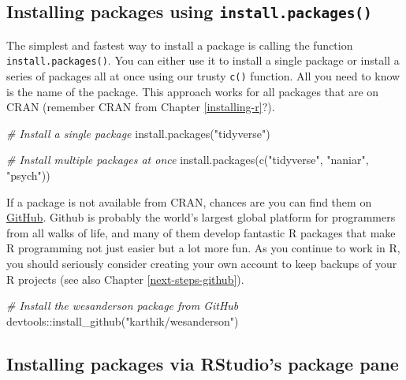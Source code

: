 \documentclass[
]{book}
\newenvironment{Shaded}{\begin{snugshade}}{\end{snugshade}}
\newcommand{\CommentTok}[1]{\textcolor[rgb]{0.56,0.35,0.01}{\textit{#1}}}
\newcommand{\FunctionTok}[1]{\textcolor[rgb]{0.00,0.00,0.00}{#1}}
\newcommand{\NormalTok}[1]{#1}
\newcommand{\SpecialCharTok}[1]{\textcolor[rgb]{0.00,0.00,0.00}{#1}}
\newcommand{\StringTok}[1]{\textcolor[rgb]{0.31,0.60,0.02}{#1}}
\begin{document}
\hypertarget{installing-packages-using-a-function}{%
\subsection{\texorpdfstring{Installing packages using \texttt{install.packages()}}{Installing packages using install.packages()}}\label{installing-packages-using-a-function}}

The simplest and fastest way to install a package is calling the function \texttt{install.packages()}. You can either use it to install a single package or install a series of packages all at once using our trusty \texttt{c()} function. All you need to know is the name of the package. This approach works for all packages that are on CRAN (remember CRAN from Chapter \ref{installing-r}?).

\begin{Shaded}
\begin{Highlighting}[]
\CommentTok{\# Install a single package}
\FunctionTok{install.packages}\NormalTok{(}\StringTok{"tidyverse"}\NormalTok{)}

\CommentTok{\# Install multiple packages at once}
\FunctionTok{install.packages}\NormalTok{(}\FunctionTok{c}\NormalTok{(}\StringTok{"tidyverse"}\NormalTok{, }\StringTok{"naniar"}\NormalTok{, }\StringTok{"psych"}\NormalTok{))}
\end{Highlighting}
\end{Shaded}

If a package is not available from CRAN, chances are you can find them on \href{https://github.com}{GitHub}. Github is probably the world's largest global platform for programmers from all walks of life, and many of them develop fantastic R packages that make R programming not just easier but a lot more fun. As you continue to work in R, you should seriously consider creating your own account to keep backups of your R projects (see also Chapter \ref{next-steps-github}).

\begin{Shaded}
\begin{Highlighting}[]
\CommentTok{\# Install the \textquotesingle{}wesanderson\textquotesingle{} package from GitHub}
\NormalTok{devtools}\SpecialCharTok{::}\FunctionTok{install\_github}\NormalTok{(}\StringTok{"karthik/wesanderson"}\NormalTok{)}
\end{Highlighting}
\end{Shaded}

\hypertarget{installing-packages-via-rstudio}{%
\subsection{Installing packages via RStudio's package pane}\label{installing-packages-via-rstudio}}
\end{document}
